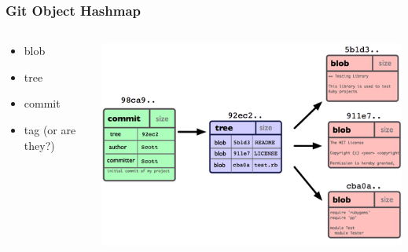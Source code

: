 \begin{frame}
	\frametitle{Git Object Hashmap}

	\begin{columns}
	\begin{column}{0.5\textwidth}
		\begin{itemize}
			\item blob
			\item tree
			\item commit
			\item tag (or are they?)
		\end{itemize}
	\end{column}
	\begin{column}{0.5\textwidth}
		\includegraphics[width=\textwidth]{images/object-types.png}
	\end{column}
	\end{columns}

\end{frame}

